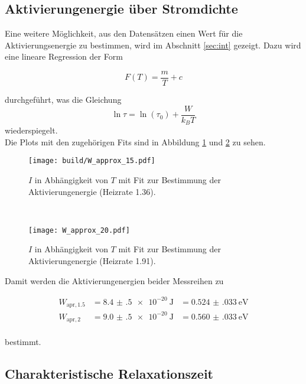 \subsection{Aktivierungenergie über Stromdichte}

Eine weitere Möglichkeit, aus den Datensätzen einen Wert für die Aktivierungsenergie zu bestimmen, wird im Abschnitt \ref{sec:int} gezeigt. 
Dazu wird eine lineare Regression der Form 

\begin{equation}
    F(T) = \frac{m}{T} + c
\end{equation}

durchgeführt, was die Gleichung 
\begin{equation}
    \ln{\tau} = \ln(\tau_0) + \frac{W}{k_B T}
\end{equation} 
wiederspiegelt.
\\
Die Plots mit den zugehörigen Fits sind in Abbildung \ref{fig:apr15} und \ref{fig:apr20} zu sehen. 
\begin{figure}
    \centering
    \texttt{[image: build/W\_approx\_15.pdf]}
    \caption{$I$ in Abhängigkeit von $T$ mit Fit zur Bestimmung der Aktivierungenergie (Heizrate 1.36).}
    \label{fig:apr15}
\end{figure}
\\
\begin{figure}
    \centering
    \texttt{[image: W\_approx\_20.pdf]}
    \caption{$I$ in Abhängigkeit von $T$ mit Fit zur Bestimmung der Aktivierungenergie (Heizrate 1.91).}
    \label{fig:apr20}
\end{figure}
\FloatBarrier

Damit werden die Aktivierungenergien beider Messreihen zu 

\begin{align*}
    W_{\text{apr},1.5} &= \SI{8.4(5)e-20}{\joule} &= \SI{0.524(033)}{\electronvolt} \\
    W_{\text{apr},2}   &= \SI{9.0(5)e-20}{\joule} &= \SI{0.560(033)}{\electronvolt} \\
\end{align*}

bestimmt. 


\subsection{Charakteristische Relaxationszeit}

